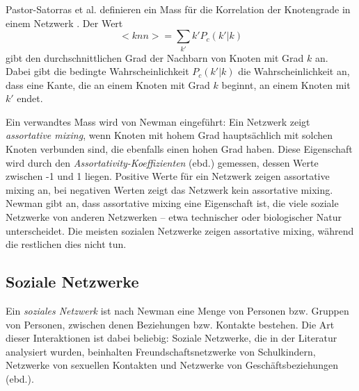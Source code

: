 Pastor-Satorras et al. definieren ein Mass für die Korrelation der
Knotengrade in einem Netzwerk \cite{PhysRevLett.87.258701}. Der Wert
\begin{equation}
  \label{eq:9}
  <knn> = \sum_{k'} k'P_c (k'|k)
\end{equation}
gibt den durchschnittlichen Grad der Nachbarn von Knoten mit Grad $k$
an.  Dabei gibt die bedingte Wahrscheinlichkeit $P_c(k'|k)$ die
Wahrscheinlichkeit an, dass eine Kante, die an einem Knoten mit Grad
$k$ beginnt, an einem Knoten mit $k'$ endet.

Ein verwandtes Mass wird von Newman eingeführt: Ein Netzwerk zeigt
\emph{assortative mixing}, wenn Knoten mit hohem Grad hauptsächlich
mit solchen Knoten verbunden sind, die ebenfalls einen hohen Grad
haben\cite{PhysRevLett.89.208701}. Diese Eigenschaft wird durch den
\emph{Assortativity-Koeffizienten} (ebd.)  gemessen, dessen Werte
zwischen -1 und 1 liegen. Positive Werte für ein Netzwerk zeigen
assortative mixing an, bei negativen Werten zeigt das Netzwerk kein
assortative mixing. Newman gibt an, dass assortative mixing eine
Eigenschaft ist, die viele soziale Netzwerke von anderen Netzwerken --
etwa technischer oder biologischer Natur unterscheidet. Die
meisten sozialen Netzwerke zeigen assortative mixing, während die
restlichen dies nicht tun.

\subsection{Soziale Netzwerke}
\label{sec:soziale-netzwerke}

Ein \emph{soziales Netzwerk} ist nach Newman\cite{newman:167} eine
Menge von Personen bzw. Gruppen von Personen, zwischen denen
Beziehungen bzw. Kontakte bestehen. Die Art dieser Interaktionen ist
dabei beliebig: Soziale Netzwerke, die in der Literatur analysiert
wurden, beinhalten Freundschaftsnetzwerke von Schulkindern, Netzwerke
von sexuellen Kontakten und Netzwerke von Geschäftsbeziehungen
(ebd.).

